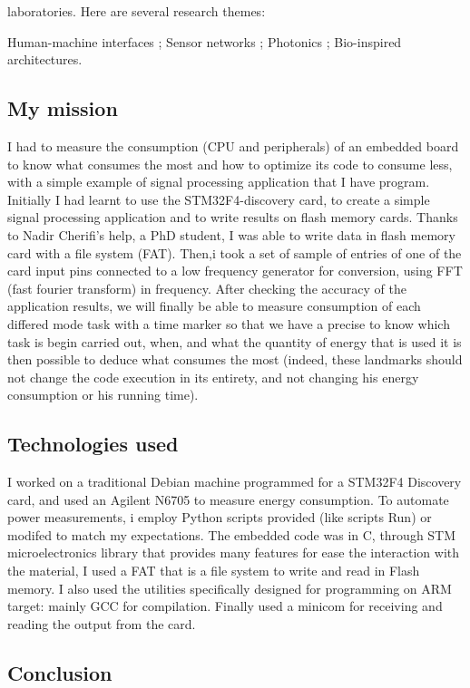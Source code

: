 \documentclass[a4paper]{article}
\begin{document}
laboratories. Here are several research themes:

    Human-machine interfaces ;
    Sensor networks ;
    Photonics ;
   Bio-inspired architectures.
    
    
\subsection{ My mission }
I had to measure the consumption (CPU and peripherals) of an embedded board to know what consumes the most and how to optimize its code to consume less, with a simple example of signal processing application that I have program. Initially I had learnt to use the STM32F4-discovery card, to create a simple signal processing application and to write results on flash memory cards. Thanks to Nadir Cherifi's help, a PhD student, I was able to write data in flash memory card with a file system (FAT). Then,i took a  set of sample of entries of one of the card input pins connected to a low frequency generator for conversion, using FFT (fast fourier transform) in frequency. After checking the accuracy of the application results, we will finally be able to measure consumption of each differed mode task with a time marker so that we have a precise to know which task is begin carried out, when, and what the quantity of energy that is used it is then possible to deduce what consumes the most (indeed, these landmarks should not change the code execution in its entirety, and not changing his energy consumption or his running time).


\subsection{ Technologies used} 
I worked on a traditional Debian machine programmed for a STM32F4 Discovery card, and used an Agilent N6705 to measure energy consumption. To automate power measurements, i employ
Python scripts provided (like scripts Run) or modifed to match my expectations. The embedded code was in C, through STM microelectronics library that provides many features for ease the interaction with the material, I used a FAT that is a file system to write and read in Flash memory. I also used the utilities specifically designed for programming on ARM target: mainly GCC for compilation. Finally used a minicom for receiving and reading the output from the card.
\subsection{ Conclusion}
\end{document}
